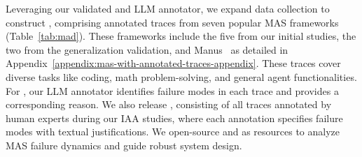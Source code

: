 Leveraging our validated \taxonomy{} and LLM annotator, we expand data collection to construct \dataset{}, comprising \numTraceInMAD{} annotated traces from seven popular MAS frameworks (Table~\ref{tab:mad}). These frameworks include the five from our initial studies, the two from the generalization validation, and Manus~\cite{manus} as detailed in Appendix~\ref{appendix:mas-with-annotated-traces-appendix}. These traces cover diverse tasks like coding, math problem-solving, and general agent functionalities. For \dataset{}, our LLM annotator identifies \taxonomy{} failure modes in each trace and provides a corresponding reason. We also release \datasetHuman{}, consisting of all traces annotated by human experts during our IAA studies, where each annotation specifies \taxonomy{} failure modes with textual justifications. We open-source \dataset{} and \datasetHuman{} as resources to analyze MAS failure dynamics and guide robust system design.
